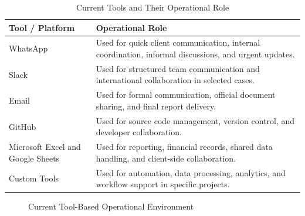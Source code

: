 \documentclass[12pt,a4paper]{report}
\begin{document}
\begin{table}[H]
\centering
\renewcommand{\arraystretch}{1.3}
\begin{tabularx}{\textwidth}{|p{4cm}|X|}
\hline
\rowcolor{secondary}
\textbf{Tool / Platform} & \textbf{Operational Role} \\
\hline
WhatsApp & Used for quick client communication, internal coordination, informal discussions, and urgent updates. \\
\hline
Slack & Used for structured team communication and international collaboration in selected cases. \\
\hline
Email & Used for formal communication, official document sharing, and final report delivery. \\
\hline
GitHub & Used for source code management, version control, and developer collaboration. \\
\hline
Microsoft Excel and Google Sheets & Used for reporting, financial records, shared data handling, and client-side collaboration. \\
\hline
Custom Tools & Used for automation, data processing, analytics, and workflow support in specific projects. \\
\hline
\end{tabularx}
\caption{Current Tools and Their Operational Role}
\end{table}

\begin{figure}[H]
\centering
{}
\caption{Current Tool-Based Operational Environment}
\end{figure}
\end{document}
